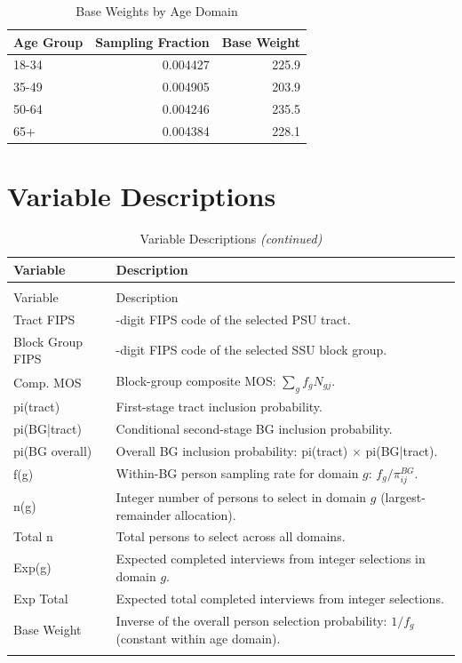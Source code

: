 \documentclass[
  11pt,
]{article}
\begin{document}
\begin{table}[!h]
\centering
\caption{\label{tab:weights-table}Base Weights by Age Domain}
\centering
\fontsize{10}{12}\selectfont
\begin{tabular}[t]{lrr}
\toprule
Age Group & Sampling Fraction & Base Weight\\
\midrule
18-34 & 0.004427 & 225.9\\
35-49 & 0.004905 & 203.9\\
50-64 & 0.004246 & 235.5\\
65+ & 0.004384 & 228.1\\
\bottomrule
\end{tabular}
\end{table}

\section{Variable Descriptions}\label{variable-descriptions}

\begingroup\fontsize{9}{11}\selectfont

\begin{longtable}[t]{>{\raggedright\arraybackslash}p{1.7in}>{\raggedright\arraybackslash}p{5.6in}}
\caption{\label{tab:var-desc}Variable Descriptions}\\
\toprule
Variable & Description\\
\midrule
\endfirsthead
\caption[]{Variable Descriptions \textit{(continued)}}\\
\toprule
Variable & Description\\
\midrule
\endhead

\endfoot
\bottomrule
\endlastfoot
Tract FIPS & 11-digit FIPS code of the selected PSU tract.\\
Block Group FIPS & 12-digit FIPS code of the selected SSU block group.\\
Comp. MOS & Block-group composite MOS: $\sum_g f_g N_{gj}$.\\
pi(tract) & First-stage tract inclusion probability.\\
pi(BG|tract) & Conditional second-stage BG inclusion probability.\\
pi(BG overall) & Overall BG inclusion probability: pi(tract) $\times$ pi(BG|tract).\\
f(g) & Within-BG person sampling rate for domain $g$: $f_g / \pi_{ij}^{BG}$.\\
n(g) & Integer number of persons to select in domain $g$ (largest-remainder allocation).\\
Total n & Total persons to select across all domains.\\
Exp(g) & Expected completed interviews from integer selections in domain $g$.\\
Exp Total & Expected total completed interviews from integer selections.\\
Base Weight & Inverse of the overall person selection probability: $1/f_g$ (constant within age domain).\\*
\end{longtable}
\endgroup{}
\end{document}
